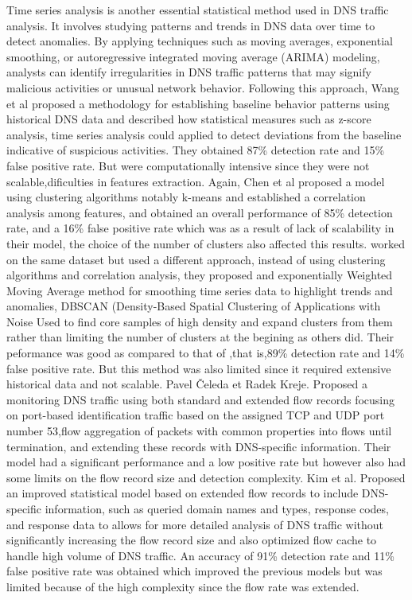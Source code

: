 Time series analysis is another essential statistical method used in DNS traffic analysis. It involves studying patterns and trends in DNS data over time to detect anomalies. By applying techniques such as moving averages, exponential smoothing, or autoregressive integrated moving average (ARIMA) modeling, analysts can identify irregularities in DNS traffic patterns that may signify malicious activities or unusual network behavior. Following this approach, Wang et al \cite{wang2021statistical} proposed a methodology for establishing baseline behavior patterns using historical DNS data and described how statistical measures such as z-score analysis, time series analysis could applied to detect deviations from the baseline indicative of suspicious activities. They obtained 87\% detection rate and 15\% false positive rate. But were computationally intensive since they were not scalable,dificulties in features extraction. Again, Chen et al \cite{chen2022comparative} proposed a model using clustering algorithms  notably k-means and established a correlation analysis among features, and obtained an overall performance of 85\% detection rate, and a 16\% false positive rate which was as a result of lack of scalability in their model, the choice of the number of clusters also affected this results. \cite{rodriguez2022time} worked on the same dataset but used a different approach, instead of using clustering algorithms and correlation analysis, they proposed and exponentially Weighted Moving Average method for smoothing time series data to highlight trends and anomalies, DBSCAN (Density-Based Spatial Clustering of Applications with Noise Used to find core samples of high density and expand clusters from them rather than limiting the number of clusters at the begining as others did. Their peformance was good as compared to that of \cite{chen2022comparative},that is,89\% detection rate and 14\% false positive rate. But this method was also limited since it required extensive historical data and not scalable. Pavel Čeleda et Radek Kreje. \cite{eunice2014} Proposed a monitoring DNS traffic using both standard and extended flow records focusing on port-based identification traffic based on the assigned TCP and UDP port number 53,flow aggregation of packets with common properties into flows until termination, and extending these records with DNS-specific information. Their model had a significant performance and a low positive rate but however also had some limits on the flow record size and detection complexity. Kim et al. \cite{kim2023improving} Proposed an improved statistical model based on extended flow records to include DNS-specific information, such as queried domain names and types, response codes, and response data to allows for more detailed analysis of DNS traffic without significantly increasing the flow record size and also optimized flow cache to handle high volume of DNS traffic. An accuracy of 91\% detection rate and 11\% false positive rate was obtained which improved the previous models but was limited because of the high complexity since the flow rate was extended.




